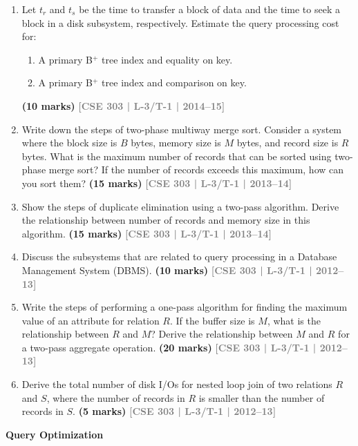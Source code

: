 \documentclass[12pt,a3paper]{article}
\newcommand{\yr}[1]{\hfill\textcolor{gray}{\small\textbf{[#1]}}}
\newcommand{\mk}[1]{\textcolor{orange!70!black}{\small\textbf{(#1 marks)}}}
\newcommand{\subtopic}[2]{%
  \vspace{10pt}
  \noindent\begin{tcolorbox}[colback=#1!8,colframe=#1,boxrule=0.6pt,arc=4pt,
    left=6pt,right=6pt,top=4pt,bottom=4pt]
    \small\bfseries\textcolor{#1}{#2}
  \end{tcolorbox}
  \vspace{2pt}
}
\begin{document}
\begin{enumerate}
\item Let $t_r$ and $t_s$ be the time to transfer a block of data and the time to seek a block in a disk subsystem, respectively. Estimate the query processing cost for:
\begin{enumerate}
  \item A primary B$^+$ tree index and equality on key.
  \item A primary B$^+$ tree index and comparison on key.
\end{enumerate}
\mk{10} \yr{CSE 303 | L-3/T-1 | 2014--15}

\item Write down the steps of two-phase multiway merge sort. Consider a system where the block size is $B$ bytes, memory size is $M$ bytes, and record size is $R$ bytes. What is the maximum number of records that can be sorted using two-phase merge sort? If the number of records exceeds this maximum, how can you sort them?
\mk{15} \yr{CSE 303 | L-3/T-1 | 2013--14}

\item Show the steps of duplicate elimination using a two-pass algorithm. Derive the relationship between number of records and memory size in this algorithm.
\mk{15} \yr{CSE 303 | L-3/T-1 | 2013--14}

\item Discuss the subsystems that are related to query processing in a Database Management System (DBMS).
\mk{10} \yr{CSE 303 | L-3/T-1 | 2012--13}

\item Write the steps of performing a one-pass algorithm for finding the maximum value of an attribute for relation $R$. If the buffer size is $M$, what is the relationship between $R$ and $M$? Derive the relationship between $M$ and $R$ for a two-pass aggregate operation.
\mk{20} \yr{CSE 303 | L-3/T-1 | 2012--13}

\item Derive the total number of disk I/Os for nested loop join of two relations $R$ and $S$, where the number of records in $R$ is smaller than the number of records in $S$.
\mk{5} \yr{CSE 303 | L-3/T-1 | 2012--13}

\end{enumerate}

\subtopic{cD}{Query Optimization}
\label{sub:s6-qo}
\end{document}
